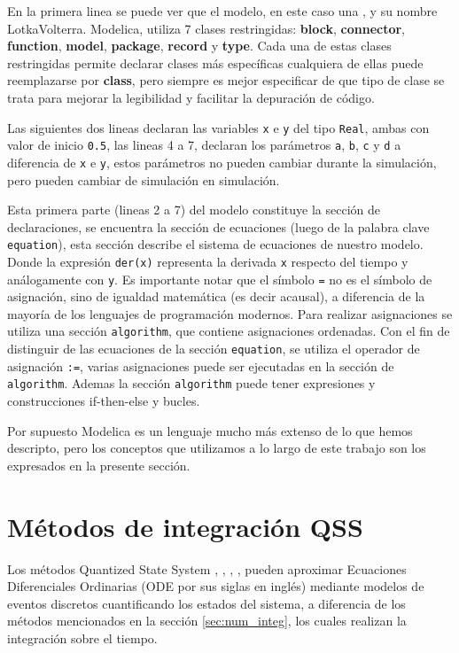 	En la primera linea se puede ver que el modelo, en este caso una , y su nombre LotkaVolterra.
	Modelica, utiliza 7 clases restringidas:
	\textbf{block}, \textbf{connector}, \textbf{function}, \textbf{model}, \textbf{package}, \textbf{record} y \textbf{type}.
	Cada una de estas clases restringidas permite declarar clases más específicas cualquiera de ellas puede reemplazarse
	por \textbf{class}, pero siempre es mejor especificar de que tipo de clase se trata para mejorar la legibilidad y facilitar la depuración de código.

	Las siguientes dos lineas declaran las variables \texttt{x} e \texttt{y} del tipo \texttt{Real}, ambas con valor de inicio \texttt{0.5}, las lineas 4 a 7, 
	declaran los parámetros \texttt{a}, \texttt{b}, \texttt{c} y \texttt{d} a diferencia de \texttt{x} e \texttt{y}, estos parámetros no pueden cambiar durante la 
	simulación, pero pueden cambiar de simulación en simulación.

	Esta primera parte (lineas 2 a 7) del modelo constituye la sección de declaraciones, se encuentra la sección de ecuaciones (luego de la palabra clave 
	\texttt{equation}), esta sección describe el sistema de ecuaciones de nuestro modelo. Donde la expresión \texttt{der(x)} representa la derivada \texttt{x} 
	respecto del tiempo y análogamente con \texttt{y}.
	Es importante notar que el símbolo \texttt{=} no es el símbolo de asignación, sino de igualdad matemática (es decir acausal), a diferencia de la mayoría 
	de  los lenguajes de programación modernos.  Para realizar asignaciones se utiliza una sección \texttt{algorithm}, que contiene asignaciones ordenadas. 
	Con el fin de distinguir de las ecuaciones de la sección \texttt{equation}, se utiliza el operador de asignación \texttt{:=}, 
	varias asignaciones puede ser ejecutadas en la sección de \texttt{algorithm}. Ademas la sección \texttt{algorithm} puede tener expresiones y construcciones 
	if-then-else y bucles.

	Por supuesto Modelica es un lenguaje mucho más extenso de lo que hemos descripto, pero los conceptos que utilizamos a lo largo de este trabajo son los
	expresados en la presente sección.


\section{Métodos de integración QSS}
	Los métodos Quantized State System \cite{Fer12}, \cite{Ber12}, \cite{Beltrame06quantisedstate}, \cite{Cel06}, pueden aproximar Ecuaciones 
	Diferenciales Ordinarias (ODE por sus siglas en inglés) mediante modelos de eventos discretos cuantificando los estados del sistema, 
	a diferencia de los métodos mencionados en la sección \ref{sec:num_integ}, los cuales realizan la integración sobre el tiempo. 

